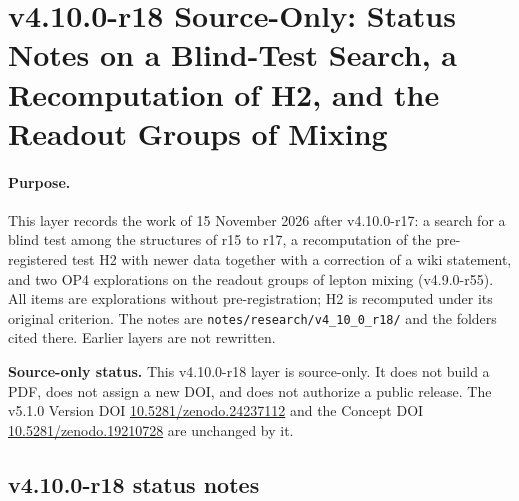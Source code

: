 
\clearpage
\section*{v4.10.0-r18 Source-Only: Status Notes on a Blind-Test Search, a Recomputation of H2, and the Readout Groups of Mixing}
\label{sec:v4100-r18-blind-search-h2-mixing}

\paragraph{Purpose.}
This layer records the work of 15 November 2026 after v4.10.0-r17: a search for a blind test among the structures of r15 to r17,
a recomputation of the pre-registered test H2 with newer data together with a correction of a wiki statement, and two OP4
explorations on the readout groups of lepton mixing (v4.9.0-r55).  All items are explorations without pre-registration; H2 is
recomputed under its original criterion.  The notes are \texttt{notes/\allowbreak research/\allowbreak v4\_10\_0\_r18/} and the
folders cited there.  Earlier layers are not rewritten.

\noindent\textbf{Source-only status.}
This v4.10.0-r18 layer is source-only.  It does not build a PDF, does not assign a new DOI,
and does not authorize a public release.  The v5.1.0 Version DOI
\href{https://doi.org/10.5281/zenodo.24237112}{10.5281/zenodo.24237112} and the Concept DOI
\href{https://doi.org/10.5281/zenodo.19210728}{10.5281/zenodo.19210728} are unchanged by it.

\subsection*{v4.10.0-r18 status notes}
\label{subsec:v4100-r18-status}

